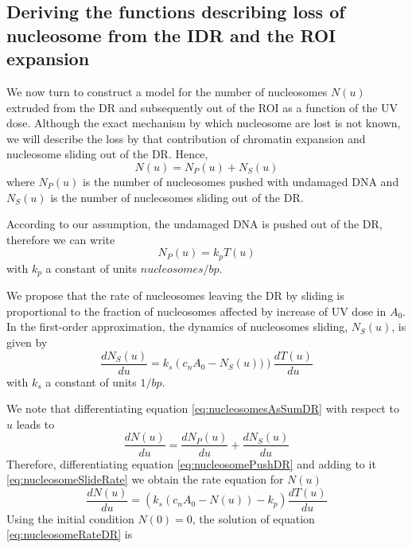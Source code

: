 \documentclass[12pt]{article}
\begin{document}
	\subsection{Deriving the functions describing loss of nucleosome from the IDR and the ROI expansion}
	We now turn to construct a model for the number of nucleosomes $N(u)$
	extruded from the DR and subsequently out of the ROI as a function of the UV dose. Although the exact mechanism by which nucleosome are lost is not known, we will describe the loss by that contribution of chromatin expansion and nucleosome sliding out of the DR. Hence,
	\begin{equation}\label{eq:nucleosomesAsSumDR}
	N(u)=N_P(u)+N_S(u)
	\end{equation}
	where $N_P(u)$ is the number of nucleosomes pushed with undamaged DNA and $N_S(u)$ is the number of nucleosomes sliding out of the DR.
	
	According to our assumption, the undamaged DNA is pushed out of the DR, therefore we can write
	\begin{equation}\label{eq:nucleosomePushDR}
	N_P(u) = k_pT(u)
	\end{equation}	
	with $k_p$ a constant of units $nucleosomes/bp $. 
	
	We propose that the rate of nucleosomes leaving the DR by sliding is proportional to the fraction of nucleosomes affected by increase of UV dose in $A_0$. In the first-order approximation, the dynamics of nucleosomes sliding, $N_S(u)$, is given by
	\begin{equation}\label{eq:nucleosomeSlideRate}
	\frac{dN_S(u)}{du} = k_s\left( c_nA_0-N_S(u))\right)\frac{dT(u)}{du}	 
	\end{equation}
	with $k_s$ a constant of units $1/bp$. 
	
	We note that differentiating equation \eqref{eq:nucleosomesAsSumDR} with respect to $u$ leads to 
	\begin{equation}
	\frac{dN(u)}{du}=\frac{dN_P(u)}{du} +\frac{dN_S(u)}{du}
	\end{equation}	
	Therefore, differentiating equation \eqref{eq:nucleosomePushDR} and adding to it \eqref{eq:nucleosomeSlideRate} we obtain the rate equation for $N(u)$ 
	\begin{equation}\label{eq:nucleosomeRateDR}
	\frac{dN(u)}{du}= \left(k_s(c_nA_0-N(u))-k_p\right)\frac{dT(u)}{du}
	\end{equation}
	 Using the initial condition $N(0) = 0$, the solution of equation \eqref{eq:nucleosomeRateDR} is 
	 
\end{document}
